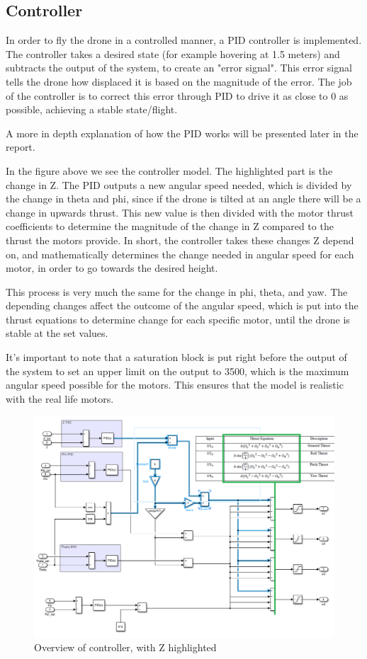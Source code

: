 \subsection{Controller}\label{linear}
In order to fly the drone in a controlled manner, a PID controller is implemented.
The controller takes a desired state (for example hovering at 1.5 meters) and subtracts the output of the system, to create an "error signal".
This error signal tells the drone how displaced it is based on the magnitude of the error. The job of the controller is to correct this error through PID to drive it as close to 0 as possible, achieving a stable state/flight.

A more in depth explanation of how the PID works will be presented later in the report. 

In the figure above we see the controller model. The highlighted part is the change in Z. The PID outputs a new angular speed needed, which is divided by the change in theta and phi, since if the drone is tilted at an angle there will be a change in upwards thrust. This new value is then divided with the motor thrust coefficients to determine the magnitude of the change in Z compared to the thrust the motors provide. In short, the controller takes these changes Z depend on, and mathematically determines the change needed in angular speed for each motor, in order to go towards the desired height. \cite{Ferry}

This process is very much the same for the change in phi, theta, and yaw. The depending changes affect the outcome of the angular speed, which is put into the thrust equations to determine change for each specific motor, until the drone is stable at the set values.

It's important to note that a saturation block is put right before the output of the system to set an upper limit on the output to 3500, which is the maximum angular speed possible for the motors. This ensures that the model is realistic with the real life motors.

\begin{figure}[H]
\begin{center}
   \includegraphics[scale =0.6]{pictures/control/Controller.png}
\end{center}
\caption{Overview of controller, with Z highlighted}
\end{figure}